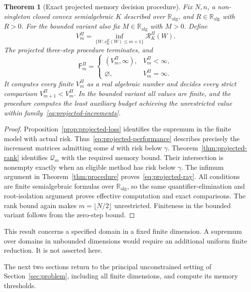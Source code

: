 \documentclass[11pt]{article}
\numberwithin{equation}{section}
\newtheorem{theorem}{Theorem}[section]
\theoremstyle{definition}
\newcommand{\K}{\mathbb R_{\mathrm{alg}}}
\newcommand{\Q}{\mathcal Q}
\newcommand{\risk}{\mathcal R}
\begin{document}
\begin{samepage}
\begin{theorem}[Exact projected memory decision procedure]\label{thm:projected-procedure}
Fix $N,n$, a non-singleton closed convex semialgebraic $K$ described over $\K$, and $R\in\K$ with $R>0$. For the bounded variant also fix $M\in\K$ with $M>0$. Define
\[
 V_m^\Pi
 =\inf_{\{W:s_K^\Pi(W)\le m+1\}}\risk_K^\Pi(W).
\]
The projected three-step procedure terminates, and
\begin{equation}
 \mathsf F_m^\Pi=
 \begin{cases}
 (V_m^\Pi,\infty),&V_m^\Pi<\infty,\\
 \varnothing,&V_m^\Pi=\infty.
 \end{cases}
 \label{eq:projected-ray}
\end{equation}
It computes every finite $V_m^\Pi$ as a real algebraic number and decides every strict comparison $V_{m+1}^\Pi<V_m^\Pi$. In the bounded variant all values are finite, and the procedure computes the least auxiliary budget achieving the unrestricted value within family~\eqref{eq:projected-increments}.
\end{theorem}
\end{samepage}
\begin{proof}
Proposition~\ref{prop:projected-loss} identifies the supremum in the finite model with actual risk. Thus~\eqref{eq:projected-performance} describes precisely the increment matrices admitting some $d$ with risk below $\gamma$. Theorem~\ref{thm:projected-rank} identifies $\Q_m$ with the required memory bound. Their intersection is nonempty exactly when an eligible method has risk below $\gamma$. The infimum argument in Theorem~\ref{thm:procedure} proves~\eqref{eq:projected-ray}. All conditions are finite semialgebraic formulas over $\K$, so the same quantifier-elimination and root-isolation argument proves effective computation and exact comparisons. The rank bound again makes $m=\lfloor N/2\rfloor$ unrestricted. Finiteness in the bounded variant follows from the zero-step bound.
\end{proof}

This result concerns a specified domain in a fixed finite dimension. A supremum over domains in unbounded dimensions would require an additional uniform finite reduction. It is not asserted here.

\FloatBarrier

The next two sections return to the principal unconstrained setting of Section~\ref{sec:problem}, including all finite dimensions, and compute its memory thresholds.
\end{document}
